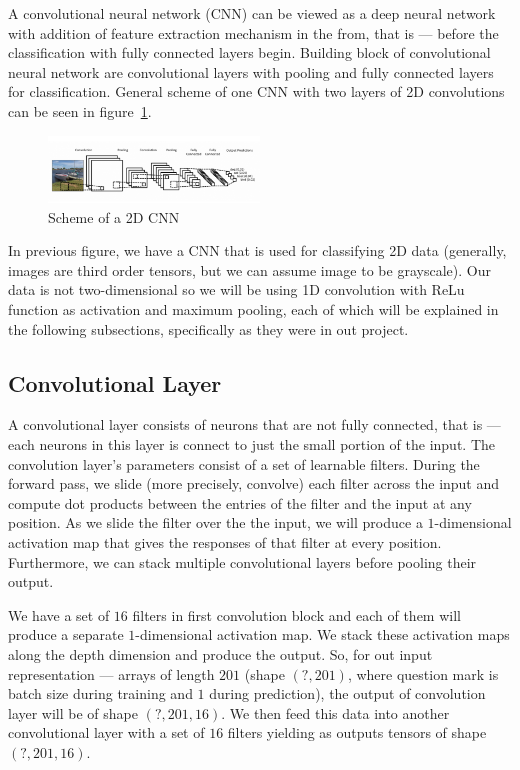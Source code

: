 \documentclass[twoside]{article}
\begin{document}
\begin{multicols}{2}
A convolutional neural network (CNN) can be viewed as a deep neural network with addition of feature extraction mechanism in the from, that is --- before the classification with fully connected layers begin. Building block of convolutional neural network are convolutional layers with pooling and fully connected layers for classification. General scheme of one CNN with two layers of 2D convolutions can be seen in figure~\ref{fig:cnn}.
\begin{figure}[H]
\includegraphics[width=0.5\textwidth]{cnn}
\caption{Scheme of a 2D CNN}
\label{fig:cnn}
\end{figure}

In previous figure, we have a CNN that is used for classifying 2D data (generally, images are third order tensors, but we can assume image to be grayscale). Our data is not two-dimensional so we will be using 1D convolution with ReLu function as activation and maximum pooling, each of which will be explained in the following subsections, specifically as they were in out project.

\subsection{Convolutional Layer}
A convolutional layer consists of neurons that are not fully connected, that is --- each neurons in this layer is connect to just the small portion of the input. The convolution layer’s parameters consist of a set of learnable filters. During the forward pass, we slide (more precisely, convolve) each filter across the input and compute dot products between the entries of the filter and the input at any position. As we slide the filter over the the input, we will produce a $1$-dimensional activation map that gives the responses of that filter at every position. Furthermore, we can stack multiple convolutional layers before pooling their output.

We have a set of $16$ filters in first convolution block and each of them will produce a separate $1$-dimensional activation map. We stack these activation maps along the depth dimension and produce the output. So, for out input representation --- arrays of length $201$ (shape $(?,201)$, where question mark is batch size during training and $1$ during prediction), the output of convolution layer will be of shape $(?,201,16)$. We then feed this data into another convolutional layer with a set of $16$ filters yielding as outputs tensors of shape $(?,201,16)$.


\end{multicols}
\end{document}
